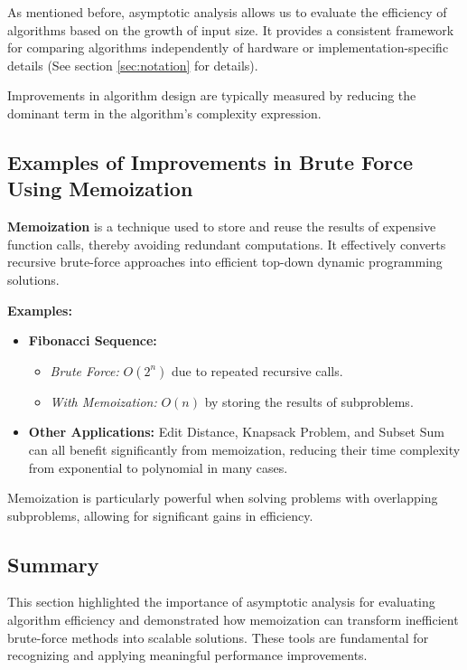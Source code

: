 \documentclass[12pt]{article}
\begin{document}
As mentioned before, asymptotic analysis allows us to evaluate the efficiency of algorithms based on the growth of input size. It provides a consistent framework for comparing algorithms independently of hardware or implementation-specific details (See section \ref{sec:notation} for details).

Improvements in algorithm design are typically measured by reducing the dominant term in the algorithm's complexity expression.

\subsection{Examples of Improvements in Brute Force Using Memoization}

\textbf{Memoization} is a technique used to store and reuse the results of expensive function calls, thereby avoiding redundant computations. It effectively converts recursive brute-force approaches into efficient top-down dynamic programming solutions.

\textbf{Examples:}
\begin{itemize}
    \item \textbf{Fibonacci Sequence:}
    \begin{itemize}
        \item \textit{Brute Force:} \(O(2^n)\) due to repeated recursive calls.
        \item \textit{With Memoization:} \(O(n)\) by storing the results of subproblems.
    \end{itemize}
    \item \textbf{Other Applications:} Edit Distance, Knapsack Problem, and Subset Sum can all benefit significantly from memoization, reducing their time complexity from exponential to polynomial in many cases.
\end{itemize}

Memoization is particularly powerful when solving problems with overlapping subproblems, allowing for significant gains in efficiency.

\subsection*{Summary}

This section highlighted the importance of asymptotic analysis for evaluating algorithm efficiency and demonstrated how memoization can transform inefficient brute-force methods into scalable solutions. These tools are fundamental for recognizing and applying meaningful performance improvements.
\end{document}
